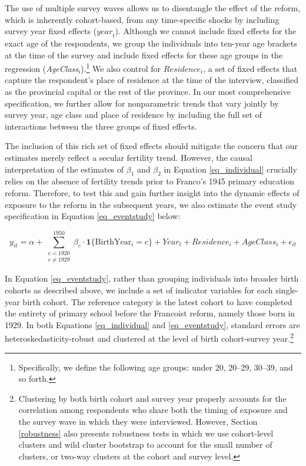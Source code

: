 \documentclass[a4paper,oneside,final,onecolumn,12pt,english]{article}
\begin{document}
The use of multiple survey waves allows us to disentangle the effect of the reform, which is inherently cohort-based, from any time-specific shocks by including survey year fixed effects ($\textit{year}_t$). Although we cannot include fixed effects for the exact age of the respondents, we group the individuals into ten-year age brackets at the time of the survey and include fixed effects for these age groups in the regression (\textit{AgeClass}$_i$).\footnote{Specifically, we define the following age groups: under 20, 20–29, 30–39, and so forth.}  We also control for $\textit{Residence}_i$, a set of fixed effects that capture the respondent's place of residence at the time of the interview, classified as the provincial capital or the rest of the province. In our most comprehensive specification, we further allow for nonparametric trends that vary jointly by survey year, age class and place of residence by including the full set of interactions between the three groups of fixed effects. 

The inclusion of this rich set of fixed effects should mitigate the concern that our estimates merely reflect a secular fertility trend. However, the causal interpretation of the estimates of $\beta_1$ and $\beta_2$ in Equation \ref{eq_individual} crucially relies on the absence of fertility trends prior to Franco's 1945 primary education reform. Therefore, to test this and gain further insight into the dynamic effects of exposure to the reform in the subsequent years, we also estimate the event study specification in Equation \ref{eq_eventstudy} below: 

\begin{equation}\label{eq_eventstudy}
y_{it} = \alpha + \sum_{\substack{c=1920 \\ c \neq 1929}}^{1950} \beta_c \cdot \mathbf{1} \{\text{BirthYear}_i = c\} + Year_t + Residence_i + AgeClass_i + \epsilon_{it}
\end{equation}

In Equation \ref{eq_eventstudy}, rather than grouping individuals into broader birth cohorts as described above, we include a set of indicator variables for each single-year birth cohort. The reference category is the latest cohort to have completed the entirety of primary school before the Francoist reform, namely those born in 1929. In both Equations \ref{eq_individual} and \ref{eq_eventstudy}, standard errors are heteroskedasticity-robust and clustered at the level of birth cohort-survey year.\footnote{Clustering by both birth cohort and survey year properly accounts for the correlation among respondents who share both the timing of exposure and the survey wave in which they were interviewed. However, Section \ref{robustness} also presents robustness tests in which we use cohort-level clusters and wild cluster bootstrap to account for the small number of clusters, or two-way clusters at the cohort and survey level.}
\end{document}
